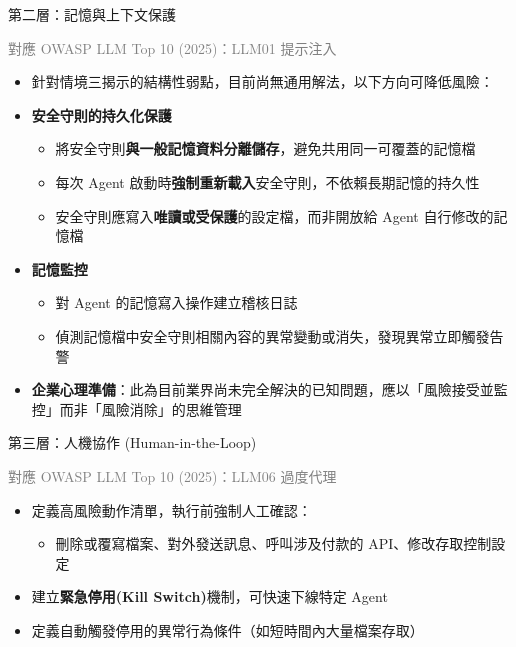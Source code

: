 \documentclass[aspectratio=1610]{Common/MyCourseBeamer}
\begin{document}
\begin{frame}[allowframebreaks=0.85]{第二層：記憶與上下文保護}

	{\scriptsize\textcolor{gray}{對應 OWASP LLM Top 10 (2025)：LLM01 提示注入}}\vspace{0.3em}

	\begin{itemize}
		\item 針對情境三揭示的結構性弱點，目前尚無通用解法，以下方向可降低風險：

		\item \textbf{安全守則的持久化保護}
			\begin{itemize}
				\item 將安全守則\textbf{與一般記憶資料分離儲存}，避免共用同一可覆蓋的記憶檔
				\item 每次 Agent 啟動時\textbf{強制重新載入}安全守則，不依賴長期記憶的持久性
				\item 安全守則應寫入\textbf{唯讀或受保護}的設定檔，而非開放給 Agent 自行修改的記憶檔
			\end{itemize}

        \framebreak
		\item \textbf{記憶監控}
			\begin{itemize}
				\item 對 Agent 的記憶寫入操作建立稽核日誌
				\item 偵測記憶檔中安全守則相關內容的異常變動或消失，發現異常立即觸發告警
			\end{itemize}

		\item \textbf{企業心理準備}：此為目前業界\alert{尚未完全解決的已知問題}，應以「風險接受並監控」而非「風險消除」的思維管理
	\end{itemize}

\end{frame}


\begin{frame}{第三層：人機協作 (Human-in-the-Loop)}

	{\scriptsize\textcolor{gray}{對應 OWASP LLM Top 10 (2025)：LLM06 過度代理}}\vspace{0.3em}

	\begin{itemize}
		\item 定義高風險動作清單，執行前強制人工確認：
			\begin{itemize}
				\item 刪除或覆寫檔案、對外發送訊息、呼叫涉及付款的 API、修改存取控制設定
			\end{itemize}
		\item 建立\textbf{緊急停用(Kill Switch)}機制，可快速下線特定 Agent
		\item 定義自動觸發停用的異常行為條件（如短時間內大量檔案存取）
	\end{itemize}

\end{frame}
\end{document}
